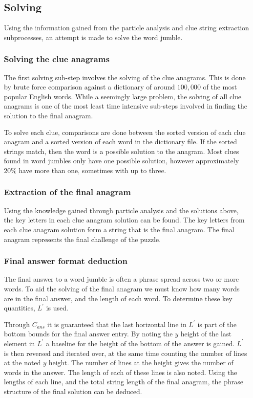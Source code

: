 \documentclass{article}
\begin{document}
	\subsection{Solving}
	Using the information gained from the particle analysis and clue string extraction subprocesses, an attempt is made to solve the word jumble.  \par 
	
	\subsubsection{Solving the clue anagrams}
	The first solving sub-step involves the solving of the clue anagrams.  This is done by brute force comparison against a dictionary of around $100,000$ of the most popular English words. While a seemingly large problem, the solving of all clue anagrams is one of the most least time intensive sub-steps involved in finding the solution to the final anagram. \par\hspace{10pt}
	 To solve each clue, comparisons are done between the sorted version of each clue anagram and a sorted version of each word in the dictionary file.  If the sorted strings match, then the word is a possible solution to the anagram.  Most clues found in word jumbles only have one possible solution, however approximately $20\%$ have more than one, sometimes with up to three. \par 
	 
	 \subsubsection{Extraction of the final anagram}
	 Using the knowledge gained through particle analysis and the solutions above, the key letters in each clue anagram solution can be found.  The key letters from each clue anagram solution form a string that is the final anagram.  The final anagram represents the final challenge of the puzzle.
	 
	\subsubsection{Final answer format deduction}
	 The final answer to a word jumble is often a phrase spread across two or more words.  To aid the solving of the final anagram we must know how many words are in the final answer, and the length of each word. To determine these key quantities, $L^\prime$ is used. \par \hspace{10pt}
	 Through $C_{ans}$ it is guaranteed that the last horizontal line in $L^\prime$ is part of the bottom bounds for the final answer entry.  By noting the $y$ height of the last element in $L^\prime$ a baseline for the height of the bottom of the answer is gained.  $L^\prime$ is then reversed and iterated over, at the same time counting the number of lines at the noted $y$ height.  The number of lines at the height gives the number of words in the answer. The length of each of these lines is also noted.  Using the lengths of each line, and the total string length of the final anagram, the phrase structure of the final solution can be deduced. 
\end{document}
